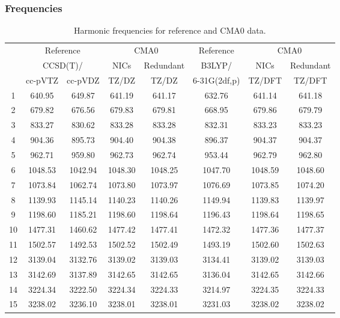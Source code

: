 \documentclass[10pt,oneside]{article}
\begin{document}
\begin{table}[h!]
\subsubsection*{Frequencies}
\centering
\caption{Harmonic frequencies for reference and CMA0 data.}
\begin{tabular}{cccccccc}
\toprule
{} & \multicolumn{2}{c}{Reference} & \multicolumn{2}{c}{CMA0} &    Reference & \multicolumn{2}{c}{CMA0} \\
{} & \multicolumn{2}{c}{CCSD(T)/} &    NICs &  Redundant &       B3LYP/ &    NICs & Redundant \\
{} &   cc-pVTZ & cc-pVDZ &   TZ/DZ &      TZ/DZ & 6-31G(2df,p) &  TZ/DFT &    TZ/DFT \\
\midrule
1  &    640.95 &  649.87 &  641.19 &     641.17 &       632.76 &  641.14 &    641.18 \\
2  &    679.82 &  676.56 &  679.83 &     679.81 &       668.95 &  679.86 &    679.79 \\
3  &    833.27 &  830.62 &  833.28 &     833.28 &       832.31 &  833.23 &    833.23 \\
4  &    904.36 &  895.73 &  904.40 &     904.38 &       896.37 &  904.37 &    904.37 \\
5  &    962.71 &  959.80 &  962.73 &     962.74 &       953.44 &  962.79 &    962.80 \\
6  &   1048.53 & 1042.94 & 1048.30 &    1048.25 &      1047.70 & 1048.59 &   1048.60 \\
7  &   1073.84 & 1062.74 & 1073.80 &    1073.97 &      1076.69 & 1073.85 &   1074.20 \\
8  &   1139.93 & 1145.14 & 1140.23 &    1140.26 &      1149.94 & 1139.83 &   1139.97 \\
9  &   1198.60 & 1185.21 & 1198.60 &    1198.64 &      1196.43 & 1198.64 &   1198.65 \\
10 &   1477.31 & 1460.62 & 1477.42 &    1477.41 &      1472.32 & 1477.36 &   1477.37 \\
11 &   1502.57 & 1492.53 & 1502.52 &    1502.49 &      1493.19 & 1502.60 &   1502.63 \\
12 &   3139.04 & 3132.76 & 3139.02 &    3139.03 &      3134.41 & 3139.02 &   3139.03 \\
13 &   3142.69 & 3137.89 & 3142.65 &    3142.65 &      3136.04 & 3142.65 &   3142.66 \\
14 &   3224.34 & 3222.50 & 3224.34 &    3224.33 &      3214.97 & 3224.35 &   3224.33 \\
15 &   3238.02 & 3236.10 & 3238.01 &    3238.01 &      3231.03 & 3238.02 &   3238.02 \\
\bottomrule
\end{tabular}
\end{table}
\end{document}
